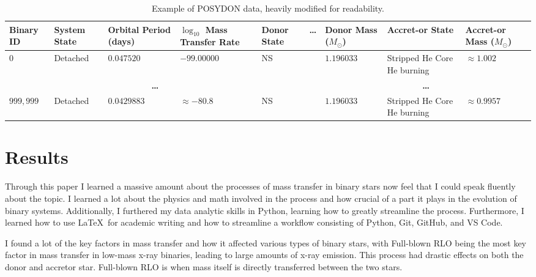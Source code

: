 \documentclass[12pt, a4paper]{article}
\begin{document}
    \begin{table}[H]
        \footnotesize
            \centering
            \begin{tabularx}{\textwidth}{||X|X|X|X|X||X||X|X|X||}
                \hline 
                \textbf{Binary ID} & 
                \textbf{System State} & 
                \textbf{Orbital Period (days)} & 
                \textbf{$\log_{10}$ Mass Transfer Rate} & 
                \textbf{Donor State} & 
                \textbf{\ldots}&
                \textbf{Donor Mass} ($M_\odot$) & 
                \textbf{Accret-or State} & 
                \textbf{Accret-or Mass} ($M_\odot$) \\
                \hline \hline
                $0$ & Detached & $0.047520$ & $-99.00000$ & NS & & $1.196033$ & Stripped He Core He burning & $\approx 1.002$ \\
                \hline
                \multicolumn{5}{||c||}{\textbf{\ldots}} & & \multicolumn{3}{c||}{\textbf{\ldots}}\\
                \hline
                $999,999$ & Detached & $0.0429883$ & $\approx -80.8$ & NS & & $1.196033$ & Stripped He Core He burning & $\approx 0.9957$ \\
                \hline
            \end{tabularx}
            \caption{Example of POSYDON data, heavily modified for readability.}
            \label{POSYDONDataExample}
        \end{table}
        


\section{Results}
    Through this paper I learned a massive amount about the processes of mass transfer in binary stars now feel that I could speak fluently about the topic. I learned a lot about the physics and math involved in the process and how crucial of a part it plays in the evolution of binary systems. Additionally, I furthered my data analytic skills in Python, learning how to greatly streamline the process. Furthermore, I learned how to use \LaTeX~for academic writing and how to streamline a workflow consisting of Python, Git, GitHub, and VS Code.

    I found a lot of the key factors in mass transfer and how it affected various types of binary stars, with Full-blown RLO being the most key factor in mass transfer in low-mass x-ray binaries, leading to large amounts of x-ray emission. This process had drastic effects on both the donor and accretor star. Full-blown RLO is when mass itself is directly transferred between the two stars.
\end{document}
